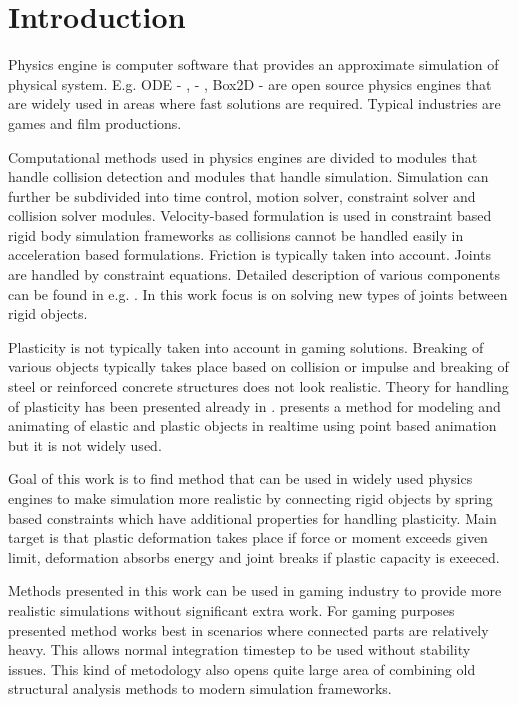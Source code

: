 \section{Introduction}

Physics engine is computer software that provides an approximate simulation of physical system. 
E.g. ODE - \cite{ode}, \bullet - \cite{bullet}, Box2D - \cite{box2d} are open source physics engines that are  widely used in 
areas where fast solutions are required. Typical industries are games and film productions.

Computational methods used in physics engines are divided to modules that handle collision detection and modules that handle simulation.
Simulation can further be subdivided into time control, motion solver, constraint solver and collision solver modules.
Velocity-based formulation is used in constraint based rigid body simulation frameworks as collisions cannot be handled easily in acceleration based formulations. Friction is typically taken into account. Joints are handled by constraint equations.
Detailed description of various components  can be found in e.g. \cite{erleben.thesis}.
In this work focus is on solving new types of joints between rigid objects.

Plasticity is not typically taken into account in gaming solutions. 
Breaking of various objects typically takes place based on collision or impulse and breaking of steel or 
reinforced concrete structures does not look realistic.
Theory for handling of plasticity has been presented already in \cite{cg1988}. 
\cite{muller2004point} presents a method for modeling and animating of elastic and plastic objects in realtime using point based animation but it is not widely used.

Goal of this work is to find method that can be used in widely used physics engines to make simulation more realistic
by connecting rigid objects by  spring based constraints which have additional properties for handling plasticity.
Main target is that plastic deformation takes place if force or moment exceeds given limit, deformation absorbs energy and 
joint breaks if plastic capacity is exeeced.

Methods presented in this work can be used in gaming industry to provide more realistic simulations without significant extra work. 
For gaming purposes presented method works best in scenarios where connected parts are relatively heavy. 
This allows normal integration timestep to be used without stability issues.
This kind of metodology also opens quite large area of combining old structural analysis methods to modern simulation frameworks.
